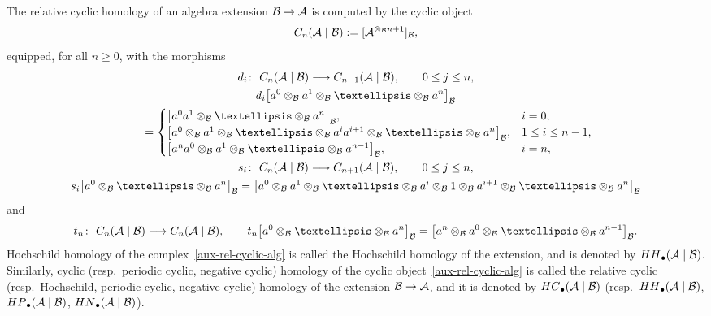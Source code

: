 \documentclass[11pt]{article}
\numberwithin{equation}{section}
\begin{document}
The relative cyclic homology of an algebra extension ${\cal B}\rightarrow {\cal A}$ is computed by the cyclic object
\begin{gather}
\label{aux-rel-cyclic-alg}
{\rm C}_n({\cal A}\mid{\cal B}):=[{\cal A}^{\otimes_{\cal B} n+1}]_{\cal B},
\end{gather}
equipped, for all $n\geq 0$, with the morphisms
\begin{gather*}%
d_i\colon \ {\rm C}_n({\cal A}\mid{\cal B}) \longrightarrow {\rm C}_{n-1}({\cal A}\mid{\cal B}),
\qquad
0 \leq j \leq n,
\\
d_i\big[a^0 \otimes_{\cal B} a^1 \otimes_{\cal B} \dots \otimes_{\cal B} a^n\big]_{\cal B}\\
\qquad{}
=\begin{cases}
\big[a^0 a^1 \otimes_{\cal B} \dots \otimes_{\cal B} a^n \big]_{\cal B}, & i =0,
\\
\big[a^0 \otimes_{\cal B} a^1 \otimes_{\cal B} \dots \otimes_{\cal B} a^i a^{i+1} \otimes_{\cal B} \dots \otimes_{\cal B} a^n \big]_{\cal B},& 1\leq i\leq n-1,
\\
\big[a^n a^0 \otimes_{\cal B} a^1 \otimes_{\cal B} \dots \otimes_{\cal B} a^{n-1}\big]_{\cal B}, & i =n,
\end{cases}
\\
s_i\colon \ {\rm C}_n({\cal A}\mid{\cal B}) \longrightarrow {\rm C}_{n+1}({\cal A}\mid{\cal B}),
\qquad
0 \leq j \leq n,
\\
s_i\big[a^0 \otimes_{\cal B} \dots \otimes_{\cal B} a^n\big]_{\cal B} =\big[a^0 \otimes_{\cal B} a^1
\otimes_{\cal B} \dots \otimes_{\cal B} a^i \otimes_{\cal B} 1 \otimes_{\cal B} a^{i+1} \otimes_{\cal B} \dots
\otimes_{\cal B} a^n \big]_{\cal B}
\end{gather*}
and
\begin{gather*}%
t_n\colon \ {\rm C}_n({\cal A}\mid{\cal B}) \longrightarrow {\rm C}_n({\cal A}\mid{\cal B}),
\qquad
t_n\big[a^0 \otimes_{\cal B} \dots \otimes_{\cal B} a^n\big]_{\cal B} =\big[a^n \otimes_{\cal B} a^0
\otimes_{\cal B} \dots \otimes_{\cal B} a^{n-1}\big]_{\cal B}.
\end{gather*}
Hochschild homology of the complex~\eqref{aux-rel-cyclic-alg} is called the Hochschild homology of the extension, and is
denoted by ${\rm HH}_\bullet({\cal A}\mid{\cal B})$.
Similarly, cyclic (resp.\
periodic cyclic, negative cyclic) homology of the cyclic object~\eqref{aux-rel-cyclic-alg} is called the relative cyclic
(resp.\ Hochschild, periodic cyclic, negative cyclic) homology of the extension ${\cal B} \rightarrow{\cal A}$, and it is
denoted by ${\rm HC}_\bullet({\cal A}\mid{\cal B})$ (resp.\
${\rm HH}_\bullet({\cal A}\mid{\cal B})$, ${\rm HP}_\bullet({\cal A}\mid{\cal B})$, ${\rm HN}_\bullet({\cal A}\mid{\cal B})$).
\end{document}
